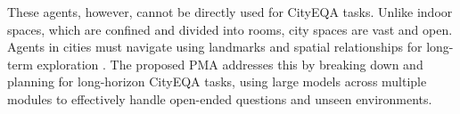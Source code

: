 These agents, however, cannot be directly used for CityEQA tasks. Unlike indoor spaces, which are confined and divided into rooms, city spaces are vast and open. Agents in cities must navigate using landmarks and spatial relationships for long-term exploration \cite{zeng2024perceive, liu2024navagent}. The proposed PMA addresses this by breaking down and planning for long-horizon CityEQA tasks, using large models across multiple modules to effectively handle open-ended questions and unseen environments.